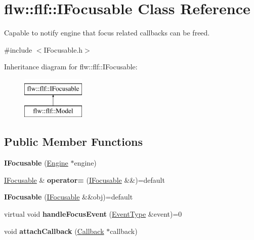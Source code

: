 \hypertarget{classflw_1_1flf_1_1IFocusable}{}\section{flw\+:\+:flf\+:\+:I\+Focusable Class Reference}
\label{classflw_1_1flf_1_1IFocusable}


Capable to notify engine that focus related callbacks can be freed.  




{\ttfamily \#include $<$I\+Focusable.\+h$>$}

Inheritance diagram for flw\+:\+:flf\+:\+:I\+Focusable\+:\begin{figure}[H]
\begin{center}
\leavevmode
\includegraphics[height=2.000000cm]{classflw_1_1flf_1_1IFocusable}
\end{center}
\end{figure}
\subsection*{Public Member Functions}
\begin{DoxyCompactItemize}
\item 
{\bfseries I\+Focusable} (\hyperlink{classflw_1_1Engine}{Engine} $\ast$engine)\hypertarget{classflw_1_1flf_1_1IFocusable_ae388785b7481c5954481312b923bc4f1}{}\label{classflw_1_1flf_1_1IFocusable_ae388785b7481c5954481312b923bc4f1}

\item 
\hyperlink{classflw_1_1flf_1_1IFocusable}{I\+Focusable} \& {\bfseries operator=} (\hyperlink{classflw_1_1flf_1_1IFocusable}{I\+Focusable} \&\&)=default\hypertarget{classflw_1_1flf_1_1IFocusable_a1dd1b324b15e2bcfc123ccb6157eaa6a}{}\label{classflw_1_1flf_1_1IFocusable_a1dd1b324b15e2bcfc123ccb6157eaa6a}

\item 
{\bfseries I\+Focusable} (\hyperlink{classflw_1_1flf_1_1IFocusable}{I\+Focusable} \&\&obj)=default\hypertarget{classflw_1_1flf_1_1IFocusable_aab45eb8511a332d20b6887193bf90941}{}\label{classflw_1_1flf_1_1IFocusable_aab45eb8511a332d20b6887193bf90941}

\item 
virtual void {\bfseries handle\+Focus\+Event} (\hyperlink{classflw_1_1flf_1_1EventType}{Event\+Type} \&event)=0\hypertarget{classflw_1_1flf_1_1IFocusable_aea193ff346a8e7f6456dae0f9766fe31}{}\label{classflw_1_1flf_1_1IFocusable_aea193ff346a8e7f6456dae0f9766fe31}

\item 
void {\bfseries attach\+Callback} (\hyperlink{classflw_1_1flf_1_1Callback}{Callback} $\ast$callback)\hypertarget{classflw_1_1flf_1_1IFocusable_af8656575da10b5238cdcbe69697f09b3}{}\label{classflw_1_1flf_1_1IFocusable_af8656575da10b5238cdcbe69697f09b3}

\end{DoxyCompactItemize}
